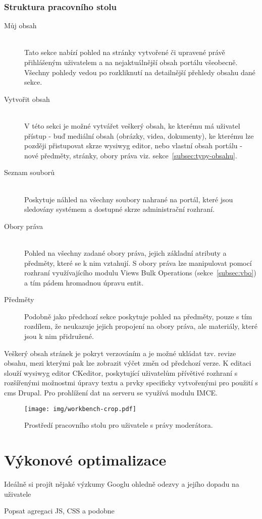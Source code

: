 \subsubsection*{Struktura pracovního stolu}
\begin{description}
  \item[Můj obsah] \hfill \\
  Tato sekce nabízí pohled na stránky vytvořené či upravené právě přihlášeným uživatelem a na nejaktuálnější obsah portálu všeobecně. Všechny pohledy vedou po rozkliknutí na detailnější přehledy obsahu dané sekce.  
  \item [Vytvořit obsah] \hfill \\
  V této sekci je možné vytvářet veškerý obsah, ke kterému má uživatel přístup - buď mediální obsah (obrázky, videa, dokumenty), ke kterému lze později přistupovat skrze \gls{wysiwyg} editor, nebo vlastní obsah portálu - nové předměty, stránky, obory práva viz. sekce~\ref{subsec:typy-obsahu}.
  \item [Seznam souborů] \hfill \\
  Poskytuje náhled na všechny soubory nahrané na portál, které jsou sledovány systémem a dostupné skrze administrační rozhraní.
  \item [Obory práva] \hfill \\
  Pohled na všechny zadané obory práva, jejich základní atributy a předměty, které se k nim vztahují. S obory práva lze manipulovat pomocí rozhraní využívajícího modulu Views Bulk Operations (sekce~\ref{subsec:vbo}) a tím pádem hromadnou úpravu entit.
  \item [Předměty]
  Podobně jako předchozí sekce poskytuje pohled na předměty, pouze s tím rozdílem, že neukazuje jejich propojení na obory práva, ale materiály, které jsou k nim přidružené.
\end{description}

Veškerý obsah stránek je pokryt verzováním a je možné ukládat tzv. revize obsahu, mezi kterými pak lze zobrazit výčet změn od předchozí verze. K editaci slouží \gls{wysiwyg} editor CKeditor, poskytující uživatelům přívětivé rozhraní s rozšířenými možnostmi úpravy textu a prvky specificky vytvořenými pro použití s \gls{cms} Drupal. Pro prohlížení dat na serveru se využívá modulu IMCE.

\begin{figure}[htp]
  \texttt{[image: img/workbench-crop.pdf]}
  \caption{Prostředí pracovního stolu pro uživatele s právy moderátora.}
  \label{fig:workbench}
\end{figure}  

\section{Výkonové optimalizace}
Ideálně si projít nějaké výzkumy Googlu ohledně odezvy a jejího dopadu na uživatele

\cite{high-performance-drupal}

Popsat agregaci JS, CSS a podobne 
\cite{website:drupal:optimizing}
